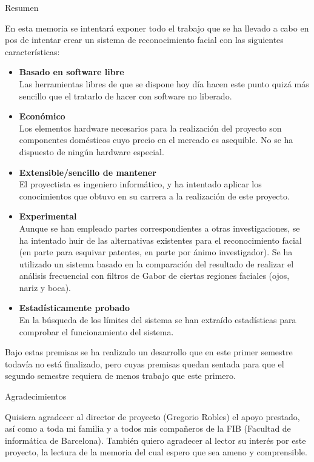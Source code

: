 \begin{center}
\Huge{Resumen}\\[2cm]
\end{center}

En esta memoria se intentará exponer todo el trabajo que se ha llevado a cabo en pos de intentar crear un sistema de reconocimiento facial con las siguientes características:
\begin{itemize}
	\item{\textbf{Basado en software libre}\\
	Las herramientas libres de que se dispone hoy día hacen este punto quizá más sencillo que el tratarlo de hacer con software no liberado.}
	\item{\textbf{Económico}\\
	Los elementos hardware necesarios para la realización del proyecto son componentes domésticos cuyo precio en el mercado es asequible. No se ha dispuesto de ningún hardware especial. }
	\item{\textbf{Extensible/sencillo de mantener}\\
	El proyectista es ingeniero informático, y ha intentado aplicar los conocimientos que obtuvo en su carrera a la realización de este proyecto.}
	\item{\textbf{Experimental}\\
	Aunque se han empleado partes correspondientes a otras investigaciones, se ha intentado huir de las alternativas existentes para el reconocimiento facial (en parte para esquivar patentes, en parte por ánimo investigador). Se ha utilizado un sistema basado en la comparación del resultado de realizar el análisis frecuencial con filtros de Gabor de ciertas regiones faciales (ojos, nariz y boca).}
	\item{\textbf{Estadísticamente probado}\\
	En la búsqueda de los límites del sistema se han extraído estadísticas para comprobar el funcionamiento del sistema.}
\end{itemize}
Bajo estas premisas se ha realizado un desarrollo que en este primer semestre todavía no está finalizado, pero cuyas premisas quedan sentada para que el segundo semestre requiera de menos trabajo que este primero.\\[2cm]

\begin{center}
\Large{Agradecimientos}
\end{center}

Quisiera agradecer al director de proyecto (Gregorio Robles) el apoyo prestado, así como a toda mi familia y a todos mis compañeros de la FIB (Facultad de informática de Barcelona). También quiero agradecer al lector su interés por este proyecto, la lectura de la memoria del cual espero que sea ameno y comprensible. \\

